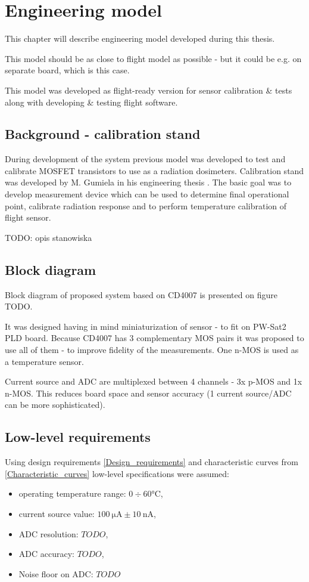 \chapter{Engineering model}
This chapter will describe engineering model developed during this thesis.

This model should be as close to flight model as possible - but it could be e.g. on separate board, which is this case.

This model was developed as flight-ready version for sensor calibration \& tests along with developing \& testing flight software.

\section{Background - calibration stand}
    During development of the system previous model was developed to test and calibrate MOSFET transistors to use as a radiation dosimeters. Calibration stand was developed by M. Gumiela in his engineering thesis \cite{MGThesis}. The basic goal was to develop measurement device which can be used to determine final operational point, calibrate radiation response and to perform temperature calibration of flight sensor.

    TODO: opis stanowiska


\section{Block diagram}
    Block diagram of proposed system based on CD4007 is presented on figure TODO.

    It was designed having in mind miniaturization of sensor - to fit on PW-Sat2 PLD board. Because CD4007 has 3 complementary MOS pairs it was proposed to use all of them - to improve fidelity of the measurements. One n-MOS is used as a temperature sensor.

    Current source and ADC are multiplexed between 4 channels - 3x p-MOS and 1x n-MOS. This reduces board space and sensor accuracy (1 current source/ADC can be more sophisticated).

\section{Low-level requirements}
    Using design requirements \ref{Design_requirements} and characteristic curves from \ref{Characteristic_curves} low-level specifications were assumed:
    \begin{itemize}
        \item operating temperature range: $0 \div 60 \si{\degreeCelsius}$,
        \item current source value: $\SI{100}{\micro\ampere} \pm \SI{10}{\nano\ampere}$,
        \item ADC resolution: $TODO$,
        \item ADC accuracy: $TODO$,
        \item Noise floor on ADC: $TODO$
    \end{itemize}

